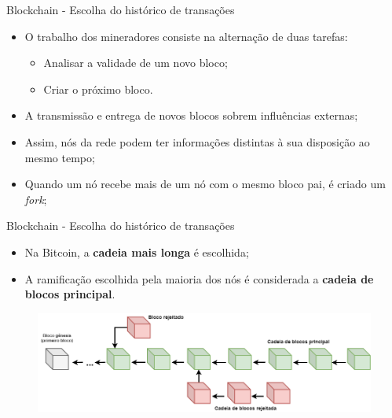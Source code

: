 \begin{frame}{Blockchain - Escolha do histórico de transações}
    \begin{itemize}
    \item O trabalho dos mineradores consiste na alternação de duas tarefas:
    \begin{itemize}
        \item Analisar a validade de um novo bloco;
        \item Criar o próximo bloco.
    \end{itemize}
    \item A transmissão e entrega de novos blocos sobrem influências externas;
    \item Assim, nós da rede podem ter informações distintas à sua disposição ao mesmo tempo;
    \item Quando um nó recebe mais de um nó com o mesmo bloco pai, é criado um \textit{fork};
    \end{itemize}
\end{frame}

\begin{frame}{Blockchain - Escolha do histórico de transações}
    \begin{itemize}
        \item Na Bitcoin, a \textbf{cadeia mais longa} é escolhida;
        \item A ramificação escolhida pela maioria dos nós é considerada a \textbf{cadeia de blocos principal}.
    \end{itemize}
    \begin{figure}[!htb]
    \centering
    \includegraphics[scale=0.3]{figuras/blockchain/cadeia_de_blocos.png}
    \end{figure}    
\end{frame}

